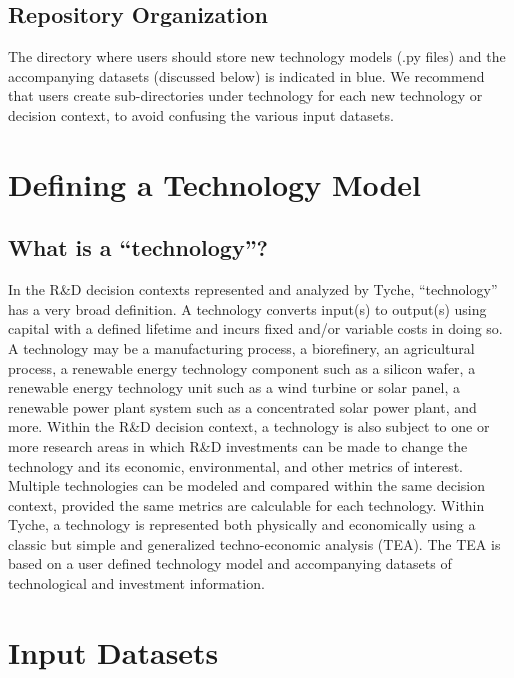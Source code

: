 \documentclass[letterpaper,10pt,english]{sphinxmanual}
\begin{document}
\subsection{Repository Organization}
\label{\detokenize{cheat-sheet:repository-organization}}
The directory where users should store new technology models (.py files) and the accompanying datasets (discussed below) is indicated in blue. We recommend that users create sub-directories under technology for each new technology or decision context, to avoid confusing the various input datasets.


\section{Defining a Technology Model}
\label{\detokenize{cheat-sheet:defining-a-technology-model}}

\subsection{What is a “technology”?}
\label{\detokenize{cheat-sheet:what-is-a-technology}}
In the R\&D decision contexts represented and analyzed by Tyche, “technology” has a very broad definition. A technology converts input(s) to output(s) using capital with a defined lifetime and incurs fixed and/or variable costs in doing so. A technology may be a manufacturing process, a biorefinery, an agricultural process, a renewable energy technology component such as a silicon wafer, a renewable energy technology unit such as a wind turbine or solar panel, a renewable power plant system such as a concentrated solar power plant, and more. Within the R\&D decision context, a technology is also subject to one or more research areas in which R\&D investments can be made to change the technology and its economic, environmental, and other metrics of interest. Multiple technologies can be modeled and compared within the same decision context, provided the same metrics are calculable for each technology. Within Tyche, a technology is represented both physically and economically using a classic but simple and generalized techno-economic analysis (TEA). The TEA is based on a user defined technology model and accompanying datasets of technological and investment information.


\section{Input Datasets}
\label{\detokenize{cheat-sheet:input-datasets}}
\end{document}
